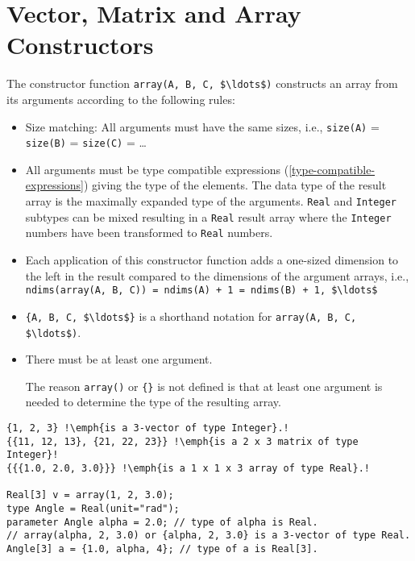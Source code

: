 \section{Vector, Matrix and Array Constructors}

The constructor function \lstinline!array(A, B, C, $\ldots$)! constructs an array from its arguments according to the following rules:
\begin{itemize}
\item
  Size matching: All arguments must have the same sizes, i.e.,
  \lstinline!size(A)! = \lstinline!size(B)! = \lstinline!size(C)! = \ldots
\item
  All arguments must be type compatible expressions (\autoref{type-compatible-expressions}) giving the type of the elements.  The data type of the result array is the
  maximally expanded type of the arguments. \lstinline!Real! and \lstinline!Integer! subtypes can be mixed resulting in a \lstinline!Real! result array where the
  \lstinline!Integer! numbers have been transformed to \lstinline!Real! numbers.
\item
  Each application of this constructor function adds a one-sized dimension to the left in the result compared to the dimensions of the argument arrays, i.e.,
  \lstinline!ndims(array(A, B, C)) = ndims(A) + 1 = ndims(B) + 1, $\ldots$!
\item
  \lstinline!{A, B, C, $\ldots$}! is a shorthand notation for \lstinline!array(A, B, C, $\ldots$)!.
\item
  There must be at least one argument.
  \begin{nonnormative}
  The reason \lstinline!array()! or \lstinline!{}! is not defined is that at least one argument is needed to determine the type of the resulting array.
  \end{nonnormative}
\end{itemize}

\begin{example}
\begin{lstlisting}[language=modelica, escapechar=!]
{1, 2, 3} !\emph{is a 3-vector of type Integer}.!
{{11, 12, 13}, {21, 22, 23}} !\emph{is a 2 x 3 matrix of type Integer}!
{{{1.0, 2.0, 3.0}}} !\emph{is a 1 x 1 x 3 array of type Real}.!

Real[3] v = array(1, 2, 3.0);
type Angle = Real(unit="rad");
parameter Angle alpha = 2.0; // type of alpha is Real.
// array(alpha, 2, 3.0) or {alpha, 2, 3.0} is a 3-vector of type Real.
Angle[3] a = {1.0, alpha, 4}; // type of a is Real[3].
\end{lstlisting}
\end{example}

